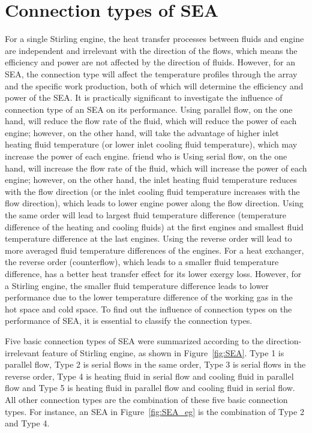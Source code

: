 \documentclass[review,3p,10t]{elsarticle}
\begin{document}
\section{Connection types of SEA~\label{sec:connectionTypes}}
For a single Stirling engine, the heat transfer processes between fluids and engine are independent and irrelevant with the direction of the flows, which means the efficiency and power are not affected by the direction of fluids. However, for an SEA, the connection type will affect the temperature profiles through the array and the specific work production, both of which will determine the efficiency and power of the SEA. It is practically significant to investigate the influence of connection type of an SEA on its performance. Using parallel flow, on the one hand, will reduce the flow rate of the fluid, which will reduce the power of each engine; however, on the other hand, will take the advantage of higher inlet heating fluid temperature (or lower inlet cooling fluid temperature), which may increase the power of each engine. friend who is Using serial flow, on the one hand, will increase the flow rate of the fluid, which will increase the power of each engine; however, on the other hand, the inlet heating fluid temperature reduces with the flow direction (or the inlet cooling fluid temperature increases with the flow direction), which leads to lower engine power along the flow direction. Using the same order will lead to largest fluid temperature difference (temperature difference of the heating and cooling fluids) at the first engines and smallest fluid temperature difference at the last engines. Using the reverse order will lead to more averaged fluid temperature differences of the engines. For a heat exchanger, the reverse order (counterflow), which leads to a smaller fluid temperature difference, has a better heat transfer effect for its lower exergy loss. However, for a Stirling engine, the smaller fluid temperature difference leads to lower performance due to the lower temperature difference of the working gas in the hot space and cold space. To find out the influence of connection types on the performance of SEA, it is essential to classify the connection types.

Five basic connection types of SEA were summarized according to the direction-irrelevant feature of Stirling engine, as shown in Figure~\ref{fig:SEA}. Type 1 is parallel flow, Type 2 is serial flows in the same order, Type 3 is serial flows in the reverse order, Type 4 is heating fluid in serial flow and cooling fluid in parallel flow and Type 5 is heating fluid in parallel flow and cooling fluid in serial flow. All other connection types are the combination of these five basic connection types. For instance, an SEA in Figure~\ref{fig:SEA_eg} is the combination of Type 2 and Type 4. 
\end{document}
